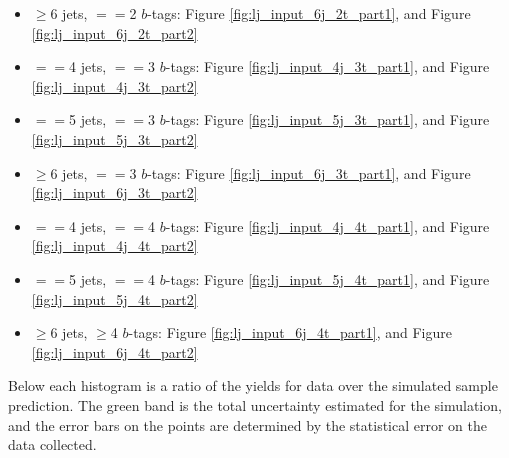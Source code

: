 \begin{itemize}
  \item $\ge$6 jets,  $==$2 $b$-tags: Figure
    \ref{fig:lj_input_6j_2t_part1}, and Figure \ref{fig:lj_input_6j_2t_part2}
  \item $==$4 jets, $==$3 $b$-tags: Figure
    \ref{fig:lj_input_4j_3t_part1}, and Figure \ref{fig:lj_input_4j_3t_part2}
  \item $==$5 jets, $==$3 $b$-tags: Figure
    \ref{fig:lj_input_5j_3t_part1}, and Figure
    \ref{fig:lj_input_5j_3t_part2}
  \item $\ge$6 jets, $==$3 $b$-tags: Figure
    \ref{fig:lj_input_6j_3t_part1}, and Figure \ref{fig:lj_input_6j_3t_part2}
  \item $==$4 jets, $==$4 $b$-tags: Figure
    \ref{fig:lj_input_4j_4t_part1}, and Figure \ref{fig:lj_input_4j_4t_part2}
  \item $==$5 jets, $==$4 $b$-tags: Figure
    \ref{fig:lj_input_5j_4t_part1}, and Figure \ref{fig:lj_input_5j_4t_part2}
  \item $\ge$6 jets, $\ge$4 $b$-tags: Figure
    \ref{fig:lj_input_6j_4t_part1}, and Figure \ref{fig:lj_input_6j_4t_part2}
\end{itemize}

\noindent Below each histogram is a ratio of the yields for data over the
simulated sample prediction.  The green band is the total uncertainty
estimated for the simulation, and the error bars on the points are
determined by the statistical error on the data collected.  


%
%

\clearpage


